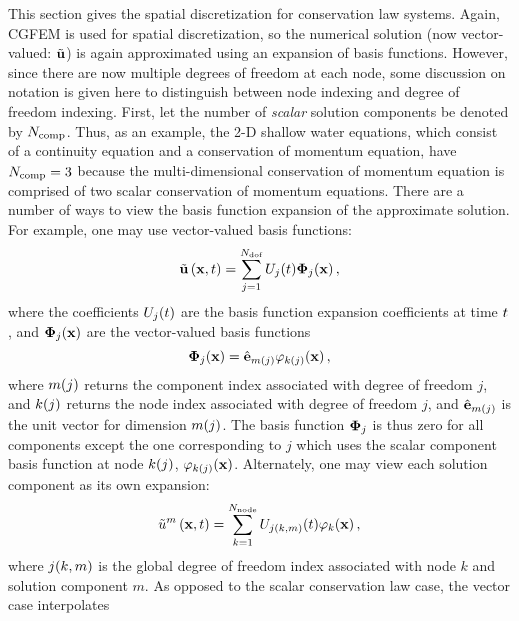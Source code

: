 This section gives the spatial discretization for conservation law systems.
Again, CGFEM is used for
spatial discretization, so the numerical solution (now vector-valued:
$\tilde{\mathbf{u}}$) is again approximated using an expansion of basis
functions. However, since there are now multiple degrees of freedom at each
node, some discussion on notation is given here to distinguish between node
indexing and degree of freedom indexing.  First, let the number of
\emph{scalar} solution components be denoted by $N_\text{comp}$.  Thus, as an
example, the 2-D shallow water equations, which consist of a continuity
equation and a conservation of momentum equation, have $N_\text{comp}=3$ because
the multi-dimensional conservation of momentum equation is comprised of two
scalar conservation of momentum equations.  There are a number of ways to view
the basis function expansion of the approximate solution. For example, one may
use vector-valued basis functions:
\begin{equation}
  \tilde{\mathbf{u}}\left(\mathbf{x},t\right) = \sum\limits_{j=1}^{N_\text{dof}}
    U_j(t)\mathbf{\Phi}_j(\mathbf{x}) \,,
\end{equation}
where the coefficients $U_j(t)$ are the basis function
expansion coefficients at time $t$, and $\mathbf{\Phi}_j(\mathbf{x})$
are the vector-valued basis functions
\begin{equation}
  \mathbf{\Phi}_j(\mathbf{x}) = 
    \hat{\mathbf{e}}_{m(j)}
      \varphi_{k(j)}(\mathbf{x})
  \,,
\end{equation}
where $m(j)$ returns the component index associated with degree
of freedom $j$, and $k(j)$ returns the node index associated with
degree of freedom $j$, and $\hat{\mathbf{e}}_{m(j)}$ is the unit vector for dimension
$m(j)$. The basis function $\mathbf{\Phi}_j$ is thus
zero for all components except the one corresponding to $j$ which uses
the scalar component basis function
at node $k(j)$, $\varphi_{k(j)}(\mathbf{x})$.
Alternately, one may view each solution component as its own expansion:
\begin{equation}
  \tilde{u}^m\left(\mathbf{x},t\right) = \sum\limits_{k=1}^{N_\text{node}}
    U_{j(k,m)}(t)\varphi_k(\mathbf{x})
  \,,
\end{equation}
where $j(k,m)$ is the global degree of freedom index associated
with node $k$ and solution component $m$.
As opposed to the scalar conservation law case, the vector case interpolates
